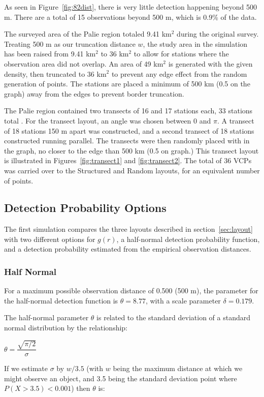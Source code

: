 \documentclass[12pt]{article}
\begin{document}
As seen in Figure~\ref{fig:82dist}, there is very little detection happening beyond 500 m. There are a total of 15 observations beyond 500 m, which is 0.9\% of the data. 

The surveyed area of the Palie region totaled 9.41 km$^2$ during the original survey. Treating 500 m as our truncation distance $w$, the study area in the simulation has been raised from 9.41 km$^2$ to 36 km$^2$ to allow for stations where the observation area did not overlap. An area of 49 km$^2$ is generated with the given density, then truncated to 36 km$^2$ to prevent any edge effect from the random generation of points. The stations are placed a minimum of 500 km (0.5 on the graph) away from the edges to prevent border truncation. 

The Palie region contained two transects of 16 and 17 stations each, 33 stations total \parencite{micronesian}. For the transect layout, an angle was chosen between $0$ and $\pi$. A transect of 18 stations 150 m apart was constructed, and a second transect of 18 stations constructed running parallel. The transects were then randomly placed with in the graph, no closer to the edge than 500 km (0.5 on graph.) This transect layout is illustrated in Figures~\ref{fig:transect1} and \ref{fig:transect2}. The total of 36 VCPs was carried over to the Structured and Random layouts, for an equivalent number of points.

\subsection{Detection Probability Options}
The first simulation compares the three layouts described in section~\ref{sec:layout} with two different options for $g(r)$, a half-normal detection probability function, and a detection probability estimated from the empirical observation distances.
\subsubsection{Half Normal}
For a maximum possible observation distance of 0.500 (500 m), the parameter for the half-normal detection function is $\theta = 8.77$, with a scale parameter $\delta = 0.179$.

The half-normal parameter $\theta$ is related to the standard deviation of a standard normal distribution by the relationship:

$\theta = \dfrac{\sqrt{\pi /2}}{\sigma}$

If we estimate $\sigma$ by $w/3.5$ (with $w$ being the maximum distance at which we might observe an object, and 3.5 being the standard deviation point where $P(X > 3.5) < 0.001$) then $\theta$ is:
\end{document}

